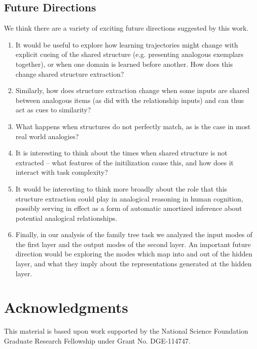 \documentclass[10pt,letterpaper]{article}
\begin{document}
\subsection{Future Directions}
We think there are a variety of exciting future directions suggested by this work. 
\begin{enumerate}
\item It would be useful to explore how learning trajectories might change with explicit cueing of the shared structure (e.g. presenting analogous exemplars together), or when one domain is learned before another. How does this change shared structure extraction?
\item Similarly, how does structure extraction change when some inputs are shared between analogous items (as \citet{Hinton1986} did with the relationship inputs) and can thus act as cues to similarity?
\item What happens when structures do not perfectly match, as is the case in most real world analogies?
\item It is interesting to think about the times when shared structure is not extracted -- what features of the initilization cause this, and how does it interact with task complexity?
\item It would be interesting to think more broadly about the role that this structure extraction could play in analogical reasoning in human cognition, possibly serving in effect as a form of automatic amortized inference about potential analogical relationships.
\item Finally, in our analysis of the family tree task we analyzed the input modes of the first layer and the output modes of the second layer. An important future direction would be exploring the modes which map into and out of the hidden layer, and what they imply about the representations generated at the hidden layer.  
\end{enumerate}
\section{Acknowledgments}
This material is based upon work supported by the National Science Foundation Graduate Research Fellowship under Grant No. DGE-114747.


\setlength{\bibleftmargin}{.125in}
\setlength{\bibindent}{-\bibleftmargin}


\end{document}
